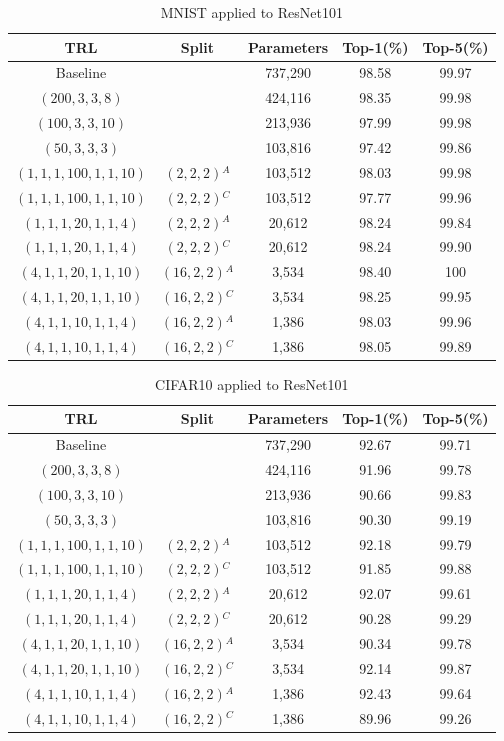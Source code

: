 \documentclass{article}
\begin{document}
\begin{table}
	\caption{MNIST applied to ResNet101}
	\label{atab-4}
	\centering
	\begin{tabular}{c c c c c}
		\toprule
		\textbf{TRL} & \textbf{Split} & \textbf{Parameters} & \textbf{Top-1(\%)} & \textbf{Top-5(\%)} \\
		\midrule
		Baseline & & 737,290 & 98.58 & 99.97 \\
		$(200,3,3,8)$ & & 424,116 & 98.35 & 99.98 \\
		$(100,3,3,10)$ & & 213,936 & 97.99 & 99.98 \\
		$(50,3,3,3)$ & & 103,816 & 97.42 & 99.86 \\
		$(1,1,1,100,1,1,10)$ & $(2,2,2)$$^A$ & 103,512 & 98.03 & 99.98 \\
		$(1,1,1,100,1,1,10)$ & $(2,2,2)$$^C$ & 103,512 & 97.77 & 99.96 \\
		$(1,1,1,20,1,1,4)$ & $(2,2,2)$$^A$ & 20,612 & 98.24 & 99.84 \\
		$(1,1,1,20,1,1,4)$ & $(2,2,2)$$^C$ & 20,612 & 98.24 & 99.90 \\
		$(4,1,1,20,1,1,10)$ & $(16,2,2)$$^A$ & 3,534 & 98.40 & 100 \\
		$(4,1,1,20,1,1,10)$ & $(16,2,2)$$^C$ & 3,534 & 98.25 & 99.95 \\
		$(4,1,1,10,1,1,4)$ & $(16,2,2)$$^A$ & 1,386 & 98.03 & 99.96 \\
		$(4,1,1,10,1,1,4)$ & $(16,2,2)$$^C$ & 1,386 & 98.05 & 99.89 \\
		\hline
	\end{tabular}
\end{table}

\begin{table}
	\caption{CIFAR10 applied to ResNet101}
	\label{atab-5}
	\centering
	\begin{tabular}{c c c c c}
		\toprule
		\textbf{TRL} & \textbf{Split} & \textbf{Parameters} & \textbf{Top-1(\%)} & \textbf{Top-5(\%)} \\
		\midrule
		Baseline & & 737,290 & 92.67 & 99.71 \\
		$(200,3,3,8)$ & & 424,116 & 91.96 & 99.78 \\
		$(100,3,3,10)$ & & 213,936 & 90.66 & 99.83 \\
		$(50,3,3,3)$ & & 103,816 & 90.30 & 99.19 \\
		$(1,1,1,100,1,1,10)$ & $(2,2,2)$$^A$ & 103,512 & 92.18 & 99.79 \\
		$(1,1,1,100,1,1,10)$ & $(2,2,2)$$^C$ & 103,512 & 91.85 & 99.88 \\
		$(1,1,1,20,1,1,4)$ & $(2,2,2)$$^A$ & 20,612 & 92.07 & 99.61 \\
		$(1,1,1,20,1,1,4)$ & $(2,2,2)$$^C$ & 20,612 & 90.28 & 99.29 \\
		$(4,1,1,20,1,1,10)$ & $(16,2,2)$$^A$ & 3,534 & 90.34 & 99.78 \\
		$(4,1,1,20,1,1,10)$ & $(16,2,2)$$^C$ & 3,534 & 92.14 & 99.87 \\
		$(4,1,1,10,1,1,4)$ & $(16,2,2)$$^A$ & 1,386 & 92.43 & 99.64 \\
		$(4,1,1,10,1,1,4)$ & $(16,2,2)$$^C$ & 1,386 & 89.96 & 99.26 \\
		\hline
	\end{tabular}
\end{table}
\end{document}
